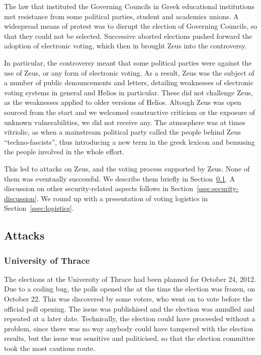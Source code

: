 \documentclass[letterpaper,10pt]{article}
\begin{document}
The law that instituted the Governing Councils in Greek educational
institutions met resistance from some political parties, student and
academics unions. A widespread means of protest was to disrupt the
election of Governing Councils, so that they could not be selected.
Successive aborted elections pushed forward the adoption of electronic
voting, which then in brought Zeus into the controversy. 

In particular, the controversy meant that some political parties were
against the use of Zeus, or any form of electronic voting. As a
result, Zeus was the subject of a number of public denouncements and
letters, detailing weaknesses of electronic voting systems in general
and Helios in particular. These did not challenge Zeus, as the
weaknesses applied to older versions of Helios. Altough Zeus was open
sourced from the start and we welcomed constructive criticism or the
exposure of unknown vulnerabilities, we did not receive any. The
atmosphere was at times vitriolic, as when a mainstream political
party called the people behind Zeus ``techno-fascists'', thus
introducing a new term in the greek lexicon and bemusing the people
involved in the whole effort.

This led to attacks on Zeus, and the voting process supported by Zeus.
None of them was eventually successful. We describe them briefly in
Section~\ref{ssec:attacks}. A discussion on other security-related
aspects follows in Section~\ref{ssec:security-discussion}. We round up
with a presentation of voting logistics in
Section~\ref{ssec:logistics}.

\subsection{Attacks}
\label{ssec:attacks}

\subsubsection{University of Thrace}

The elections at the University of Thrace had been planned for October
24, 2012. Due to a coding bug, the polls opened the at the time the
election was frozen, on October 22. This was discovered by some
voters, who went on to vote before the official poll opening. The
issue was publishised and the election was annulled and repeated at a
later date. Technically, the election could have proceeded without a
problem, since there was no way anybody could have tampered with the
election results, but the issue was sensitive and politicised, so that
the election committee took the most cautious route.
\end{document}
